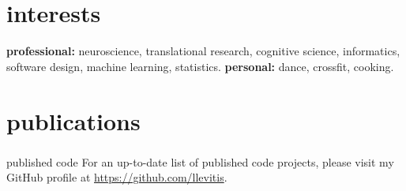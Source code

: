 \documentclass[]{friggeri-cv} %
\begin{document}

\vspace{-7pt}
\section{interests}

\textbf{professional:} neuroscience, translational research, cognitive science,
informatics, software design, machine learning, statistics.
\textbf{personal:} dance, crossfit, cooking.



\section{publications}







\subsubsection{}{published code}
For an up-to-date list of published code projects, please visit my GitHub profile at
\href{https://github.com/llevitis}{https://github.com/llevitis}.

\end{document}
